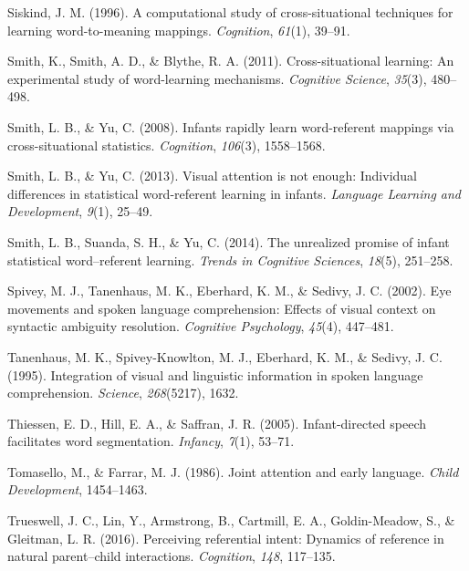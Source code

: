 \documentclass[oneside]{report}
\begin{document}
\hypertarget{ref-siskind1996computational}{}
Siskind, J. M. (1996). A computational study of cross-situational
techniques for learning word-to-meaning mappings. \emph{Cognition},
\emph{61}(1), 39--91.

\hypertarget{ref-smith2011cross}{}
Smith, K., Smith, A. D., \& Blythe, R. A. (2011). Cross-situational
learning: An experimental study of word-learning mechanisms.
\emph{Cognitive Science}, \emph{35}(3), 480--498.

\hypertarget{ref-smith2008infants}{}
Smith, L. B., \& Yu, C. (2008). Infants rapidly learn word-referent
mappings via cross-situational statistics. \emph{Cognition},
\emph{106}(3), 1558--1568.

\hypertarget{ref-smith2013visual}{}
Smith, L. B., \& Yu, C. (2013). Visual attention is not enough:
Individual differences in statistical word-referent learning in infants.
\emph{Language Learning and Development}, \emph{9}(1), 25--49.

\hypertarget{ref-smith2014unrealized}{}
Smith, L. B., Suanda, S. H., \& Yu, C. (2014). The unrealized promise of
infant statistical word--referent learning. \emph{Trends in Cognitive
Sciences}, \emph{18}(5), 251--258.

\hypertarget{ref-spivey2002eye}{}
Spivey, M. J., Tanenhaus, M. K., Eberhard, K. M., \& Sedivy, J. C.
(2002). Eye movements and spoken language comprehension: Effects of
visual context on syntactic ambiguity resolution. \emph{Cognitive
Psychology}, \emph{45}(4), 447--481.

\hypertarget{ref-tanenhaus1995integration}{}
Tanenhaus, M. K., Spivey-Knowlton, M. J., Eberhard, K. M., \& Sedivy, J.
C. (1995). Integration of visual and linguistic information in spoken
language comprehension. \emph{Science}, \emph{268}(5217), 1632.

\hypertarget{ref-thiessen2005infant}{}
Thiessen, E. D., Hill, E. A., \& Saffran, J. R. (2005). Infant-directed
speech facilitates word segmentation. \emph{Infancy}, \emph{7}(1),
53--71.

\hypertarget{ref-tomasello1986joint}{}
Tomasello, M., \& Farrar, M. J. (1986). Joint attention and early
language. \emph{Child Development}, 1454--1463.

\hypertarget{ref-trueswell2016perceiving}{}
Trueswell, J. C., Lin, Y., Armstrong, B., Cartmill, E. A.,
Goldin-Meadow, S., \& Gleitman, L. R. (2016). Perceiving referential
intent: Dynamics of reference in natural parent--child interactions.
\emph{Cognition}, \emph{148}, 117--135.
\end{document}
